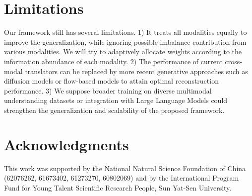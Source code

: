 \documentclass{article}
\begin{document}
\section*{Limitations}
Our framework still has several limitations. 1) It treats all modalities equally to improve the generalization, while ignoring possible imbalance contribution from various modalities. We will try to adaptively allocate weights according to the information abundance of each modality. 2) The performance of current cross-modal translators can be replaced by more recent generative approaches such as diffusion models or flow-based models to attain optimal reconstruction performance. 3) We suppose broader training on diverse multimodal understanding datasets or integration with Large Language Models could strengthen the generalization and scalability of the proposed framework. 






\section*{Acknowledgments}
This work was supported by the National Natural Science Foundation of China (62076262, 61673402, 61273270, 60802069) and by the International Program Fund for Young Talent Scientific Research People, Sun Yat-Sen University.


\end{document}
